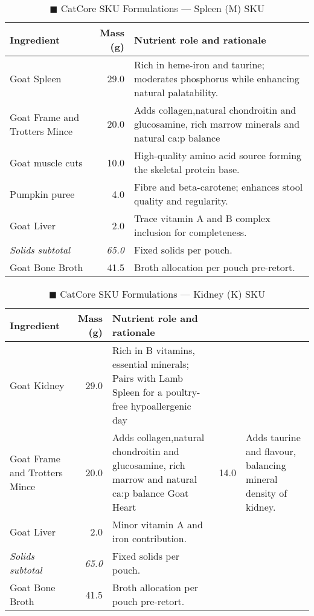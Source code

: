 \begin{table}[htbp]
\centering
\caption{\textcolor{darkbrown}{$\blacksquare$} CatCore SKU Formulations --- Spleen (M) SKU}
\label{tab:lamb_sku_3col}
\begin{adjustbox}{max width=\textwidth}
\begin{tabular}{@{}l r p{8.0cm}@{}}
\toprule
\textbf{Ingredient} & \textbf{Mass (g)} & \textbf{Nutrient role and rationale} \\
\midrule
Goat Spleen & 29.0 & Rich in heme-iron and taurine; moderates phosphorus while enhancing natural palatability. \\[3pt]
Goat Frame and Trotters Mince & 20.0 & Adds collagen,natural chondroitin and glucosamine, rich marrow minerals and natural ca:p balance \\[3pt]
Goat muscle cuts & 10.0 & High-quality amino acid source forming the skeletal protein base. \\[3pt]
Pumpkin puree & 4.0 & Fibre and beta-carotene; enhances stool quality and regularity. \\[3pt]
Goat Liver & 2.0 & Trace vitamin A and B complex inclusion for completeness. \\[3pt]
\textit{Solids subtotal} & \textit{65.0} & Fixed solids per pouch. \\[3pt]
Goat Bone Broth & 41.5 & Broth allocation per pouch pre-retort. \\[3pt]
\bottomrule
\end{tabular}
\end{adjustbox}
\end{table}


\begin{table}[htbp]
\centering
\caption{\textcolor{darkbrown}{$\blacksquare$} CatCore SKU Formulations --- Kidney (K) SKU}
\label{tab:kidney_sku_3col}
\begin{adjustbox}{max width=\textwidth}
\begin{tabular}{@{}l r p{8.0cm}@{}}
\toprule
\textbf{Ingredient} & \textbf{Mass (g)} & \textbf{Nutrient role and rationale} \\
\midrule
Goat Kidney & 29.0 & Rich in B vitamins, essential minerals; Pairs with Lamb Spleen for a poultry-free hypoallergenic day \\[3pt]
Goat Frame and Trotters Mince & 20.0 & Adds collagen,natural chondroitin and glucosamine, rich marrow and natural ca:p balance
Goat Heart & 14.0 & Adds taurine and flavour, balancing mineral density of kidney. \\[3pt]
Goat Liver & 2.0 & Minor vitamin A and iron contribution. \\[3pt]
\textit{Solids subtotal} & \textit{65.0} & Fixed solids per pouch. \\[3pt]
Goat Bone Broth & 41.5 & Broth allocation per pouch pre-retort. \\[3pt]
\bottomrule
\end{tabular}
\end{adjustbox}
\end{table}
\vspace{1em}

